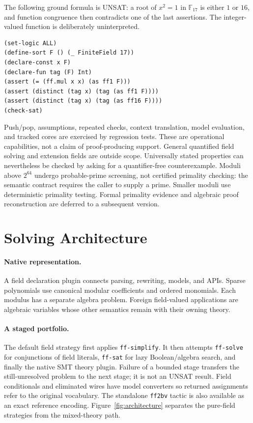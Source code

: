 \documentclass[runningheads]{llncs}
\newcommand{\FF}{\mathbb{F}}
\newcommand{\flag}[1]{\texttt{#1}}
\begin{document}
The following ground formula is UNSAT: a root of $x^2=1$ in $\FF_{17}$ is either
$1$ or $16$, and function congruence then contradicts one of the last assertions.
The integer-valued function is deliberately uninterpreted.

\begin{lstlisting}
(set-logic ALL)
(define-sort F () (_ FiniteField 17))
(declare-const x F)
(declare-fun tag (F) Int)
(assert (= (ff.mul x x) (as ff1 F)))
(assert (distinct (tag x) (tag (as ff1 F))))
(assert (distinct (tag x) (tag (as ff16 F))))
(check-sat)
\end{lstlisting}

Push/pop, assumptions, repeated checks, context translation, model evaluation,
and tracked cores are exercised by regression tests. These are operational
capabilities, not a claim of proof-producing support. General quantified field
solving and extension fields are outside scope. Universally stated properties
can nevertheless be checked by asking for a quantifier-free counterexample.
Moduli above $2^{64}$ undergo probable-prime screening, not certified primality
checking: the semantic contract requires the caller to supply a prime. Smaller
moduli use deterministic primality testing. Formal primality evidence and
algebraic proof reconstruction are deferred to a subsequent version.

\section{Solving Architecture}
\label{sec:architecture}

\paragraph{Native representation.}
A field declaration plugin connects parsing, rewriting, models, and APIs.
Sparse polynomials use canonical modular coefficients and ordered monomials.
Each modulus has a separate algebra problem. Foreign field-valued applications
are algebraic variables whose other semantics remain with their owning theory.

\paragraph{A staged portfolio.}
The default field strategy first applies \flag{ff-simplify}. It then attempts
\flag{ff-solve} for conjunctions of field literals, \flag{ff-sat} for lazy
Boolean/algebra search, and finally the native SMT theory plugin. Failure of a
bounded stage transfers the still-unresolved problem to the next stage; it is
not an UNSAT result. Field conditionals and eliminated wires have model
converters so returned assignments refer to the original vocabulary. The
standalone \flag{ff2bv} tactic is also available as an exact reference encoding.
Figure~\ref{fig:architecture} separates the pure-field strategies from the
mixed-theory path.
\end{document}
